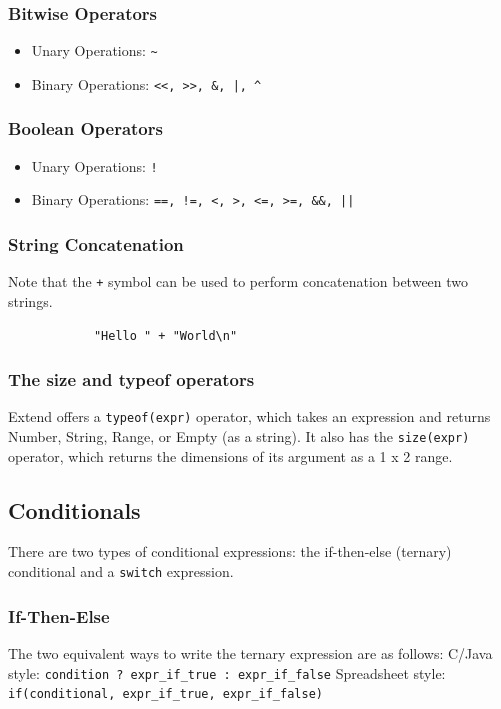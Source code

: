 		\subsubsection{Bitwise Operators}
			\begin{itemize}
				\item Unary Operations: \texttt{\~}
				\item Binary Operations: \texttt{<<, >>, \&, |, \^}
			\end{itemize}

		\subsubsection{Boolean Operators}
			\begin{itemize}
				\item Unary Operations: \texttt{!}
				\item Binary Operations: \texttt{==, !=, <, >, <=, >=, \&\&, ||}
			\end{itemize}

		\subsubsection{String Concatenation}
		Note that the \texttt{+} symbol can be used to perform concatenation between two strings.

		\begin{lstlisting}
			"Hello " + "World\n"
		\end{lstlisting}

		\subsubsection{The size and typeof operators}
		Extend offers a \texttt{typeof(expr)} operator, which takes an expression and returns Number, String, Range, or Empty (as a string). It also has the \texttt{size(expr)} operator, which returns the dimensions of its argument as a 1 x 2 range.


	\subsection{Conditionals}
	There are two types of conditional expressions: the if-then-else (ternary) conditional and a \texttt{switch} expression.

		\subsubsection{If-Then-Else}
		The two equivalent ways to write the ternary expression are as follows: \newline \newline
		C/Java style: \texttt{condition ? expr\_if\_true : expr\_if\_false} \newline \newline
		Spreadsheet style: \texttt{if(conditional, expr\_if\_true, expr\_if\_false)}

